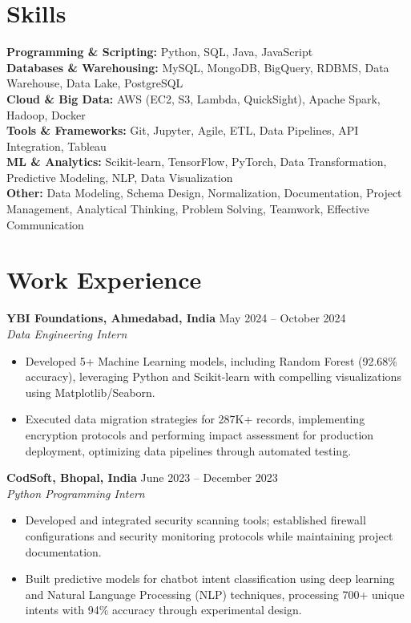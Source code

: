 \documentclass[a4paper,10pt]{article}
\begin{document}
\section*{Skills}
\textbf{Programming \& Scripting: } Python, SQL, Java, JavaScript \\
\textbf{Databases \& Warehousing:} MySQL, MongoDB, BigQuery, RDBMS, Data Warehouse, Data Lake, PostgreSQL \\
\textbf{Cloud \& Big Data:} AWS (EC2, S3, Lambda, QuickSight), Apache Spark, Hadoop, Docker \\
\textbf{Tools \& Frameworks:} Git, Jupyter, Agile, ETL, Data Pipelines, API Integration, Tableau \\
\textbf{ML & Analytics:} Scikit-learn, TensorFlow, PyTorch, Data Transformation, Predictive Modeling, NLP, Data Visualization \\
\textbf{Other: }Data Modeling, Schema Design, Normalization, Documentation, Project Management, Analytical Thinking, Problem Solving, Teamwork, Effective Communication \\

\vspace{-4mm}

\section*{Work Experience}
\textbf{YBI Foundations, Ahmedabad, India} \hfill May 2024 -- October 2024\\
\textit{Data Engineering Intern} \\
\begin{itemize}[leftmargin=*, itemsep=0pt, parsep=1pt]
\vspace{-6mm}
\item Developed 5+ Machine Learning models, including Random Forest (92.68\% accuracy), leveraging Python and Scikit-learn with compelling visualizations using Matplotlib/Seaborn.
\item Executed data migration strategies for 287K+ records, implementing encryption protocols and performing impact assessment for production deployment, optimizing data pipelines through automated testing.
\end{itemize}
\textbf{CodSoft, Bhopal, India} \hfill June 2023 -- December 2023\\
\textit{Python Programming Intern} \\
\begin{itemize}[leftmargin=*, itemsep=0pt, parsep=1pt]
\vspace{-6mm}
\item Developed and integrated security scanning tools; established firewall configurations and security monitoring protocols while maintaining project documentation.
\item Built predictive models for chatbot intent classification using deep learning and Natural Language Processing (NLP) techniques, processing 700+ unique intents with 94\% accuracy through experimental design.
\vspace{-1mm}
\end{itemize}
\end{document}
